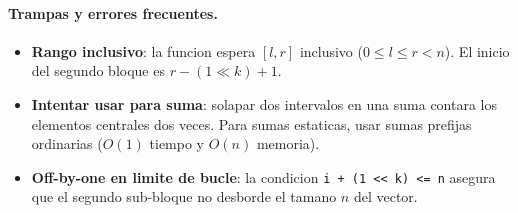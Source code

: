 \paragraph{Trampas y errores frecuentes.}
\begin{itemize}\setlength\itemsep{0pt}
	\item \textbf{Rango inclusivo}: la funcion espera $[l, r]$ inclusivo ($0 \le l \le r < n$). El inicio del segundo bloque es $r - (1 \ll k) + 1$.
	\item \textbf{Intentar usar para suma}: solapar dos intervalos en una suma contara los elementos centrales dos veces. Para sumas estaticas, usar sumas prefijas ordinarias ($O(1)$ tiempo y $O(n)$ memoria).
	\item \textbf{Off-by-one en limite de bucle}: la condicion \verb|i + (1 << k) <= n| asegura que el segundo sub-bloque no desborde el tamano $n$ del vector.
\end{itemize}

